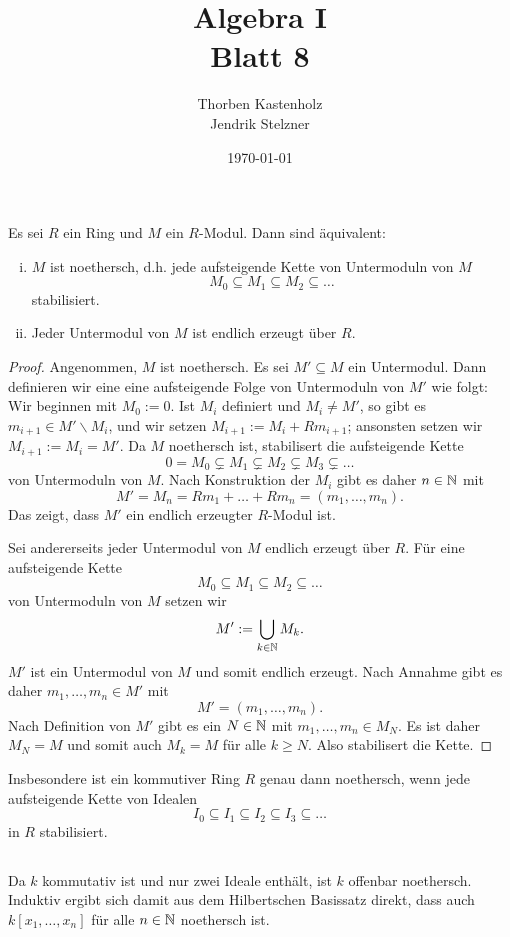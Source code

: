 \documentclass[a4paper,10pt]{article}
\title{\sc Algebra I \\ \Large Blatt 8}
\author{Thorben Kastenholz \\ Jendrik Stelzner}
\date{\today}
\begin{document}
\maketitle

\section{}

\begin{lem}
 Es sei $R$ ein Ring und $M$ ein $R$-Modul. Dann sind äquivalent:
 \begin{enumerate}[i)]
  \item $M$ ist noethersch, d.h. jede aufsteigende Kette von Untermoduln von $M$
  \[
   M_0 \subseteq M_1 \subseteq M_2 \subseteq \ldots
  \]
  stabilisiert.
  \item Jeder Untermodul von $M$ ist endlich erzeugt über $R$.
 \end{enumerate}
\end{lem}
\begin{proof}
 Angenommen, $M$ ist noethersch. Es sei $M' \subseteq M$ ein Untermodul. Dann definieren wir eine eine aufsteigende Folge von Untermoduln von $M'$ wie folgt: Wir beginnen mit $M_0 := 0$. Ist $M_i$ definiert und $M_i \neq M'$, so gibt es $m_{i+1} \in M' \smallsetminus M_i$, und wir setzen $M_{i+1} := M_i + R m_{i+1}$; ansonsten setzen wir $M_{i+1} := M_i = M'$. Da $M$ noethersch ist, stabilisert die aufsteigende Kette
 \[
  0 = M_0 \subsetneq M_1 \subsetneq M_2 \subsetneq M_3 \subsetneq \ldots
 \]
 von Untermoduln von $M$. Nach Konstruktion der $M_i$ gibt es daher $n \in \mathbb{N}$ mit
 \[
  M' = M_n = Rm_1 + \ldots + Rm_n = (m_1, \ldots, m_n).
 \]
 Das zeigt, dass $M'$ ein endlich erzeugter $R$-Modul ist.
 
 Sei andererseits jeder Untermodul von $M$ endlich erzeugt über $R$. Für eine aufsteigende Kette
 \[
  M_0 \subseteq M_1 \subseteq M_2 \subseteq \ldots
 \]
 von Untermoduln von $M$ setzen wir
 \[
  M' := \bigcup_{k \in \mathbb{N}} M_k.
 \]
 $M'$ ist ein Untermodul von $M$ und somit endlich erzeugt. Nach Annahme gibt es daher $m_1, \ldots, m_n \in M'$ mit
 \[
  M' = (m_1, \ldots, m_n).
 \]
 Nach Definition von $M'$ gibt es ein $N \in \mathbb{N}$ mit $m_1, \ldots, m_n \in M_N$. Es ist daher $M_N = M$ und somit auch $M_k = M$ für alle $k \geq N$. Also stabilisert die Kette.
\end{proof}

Insbesondere ist ein kommutiver Ring $R$ genau dann noethersch, wenn jede aufsteigende Kette von Idealen
\[
 I_0 \subseteq I_1 \subseteq I_2 \subseteq I_3 \subseteq \ldots
\]
in $R$ stabilisiert.


\subsection{}
Da $k$ kommutativ ist und nur zwei Ideale enthält, ist $k$ offenbar noethersch. Induktiv ergibt sich damit aus dem Hilbertschen Basissatz direkt, dass auch $k[x_1, \ldots, x_n]$ für alle $n \in \mathbb{N}$ noethersch ist.
\end{document}
